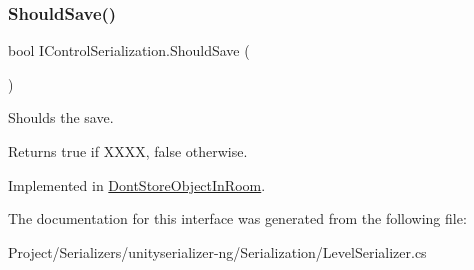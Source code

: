 \subsubsection{\texorpdfstring{Should\+Save()}{ShouldSave()}}
{\footnotesize\ttfamily bool I\+Control\+Serialization.\+Should\+Save (\begin{DoxyParamCaption}{ }\end{DoxyParamCaption})}



Shoulds the save. 

\begin{DoxyReturn}{Returns}
{\ttfamily true} if X\+X\+XX, {\ttfamily false} otherwise.
\end{DoxyReturn}


Implemented in \hyperlink{class_dont_store_object_in_room_a710cc83ab8e061a58175a2c5bf3afa89}{Dont\+Store\+Object\+In\+Room}.



The documentation for this interface was generated from the following file\+:\begin{DoxyCompactItemize}
\item 
Project/\+Serializers/unityserializer-\/ng/\+Serialization/Level\+Serializer.\+cs\end{DoxyCompactItemize}

